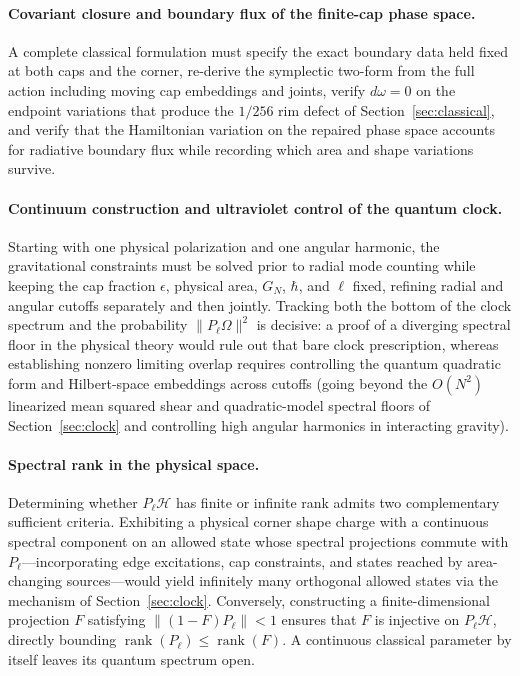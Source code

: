 \documentclass[10pt,a4paper]{article}
\numberwithin{equation}{section}
\newcommand{\rank}{\operatorname{rank}}
\newcommand{\HH}{\mathcal{H}}
\begin{document}
\paragraph{Covariant closure and boundary flux of the finite-cap phase space.}
A complete classical formulation must specify the exact boundary data held fixed at both caps and the corner, re-derive the symplectic two-form from the full action including moving cap embeddings and joints, verify $d\omega=0$ on the endpoint variations that produce the $1/256$ rim defect of Section~\ref{sec:classical}, and verify that the Hamiltonian variation on the repaired phase space accounts for radiative boundary flux while recording which area and shape variations survive.

\paragraph{Continuum construction and ultraviolet control of the quantum clock.}
Starting with one physical polarization and one angular harmonic, the gravitational constraints must be solved prior to radial mode counting while keeping the cap fraction $\epsilon$, physical area, $G_N$, $\hbar$, and $\ell$ fixed, refining radial and angular cutoffs separately and then jointly.
Tracking both the bottom of the clock spectrum and the probability $\|P_\ell\Omega\|^2$ is decisive: a proof of a diverging spectral floor in the physical theory would rule out that bare clock prescription, whereas establishing nonzero limiting overlap requires controlling the quantum quadratic form and Hilbert-space embeddings across cutoffs (going beyond the $O(N^2)$ linearized mean squared shear and quadratic-model spectral floors of Section~\ref{sec:clock} and controlling high angular harmonics in interacting gravity).

\paragraph{Spectral rank in the physical space.}
Determining whether $P_\ell\HH$ has finite or infinite rank admits two complementary sufficient criteria.
Exhibiting a physical corner shape charge with a continuous spectral component on an allowed state whose spectral projections commute with $P_\ell$---incorporating edge excitations, cap constraints, and states reached by area-changing sources---would yield infinitely many orthogonal allowed states via the mechanism of Section~\ref{sec:clock}.
Conversely, constructing a finite-dimensional projection $F$ satisfying $\|(1-F)P_\ell\|<1$ ensures that $F$ is injective on $P_\ell\HH$, directly bounding $\rank(P_\ell)\le \rank(F)$.
A continuous classical parameter by itself leaves its quantum spectrum open.
\end{document}
